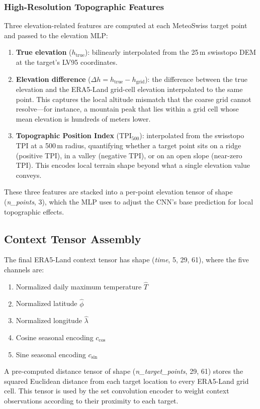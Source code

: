\subsubsection{High-Resolution Topographic Features}

Three elevation-related features are computed at each MeteoSwiss target point and passed to the elevation MLP:

\begin{enumerate}
    \item \textbf{True elevation} ($h_{\text{true}}$): bilinearly interpolated from the 25\,m swisstopo DEM at the target's LV95 coordinates.

    \item \textbf{Elevation difference} ($\Delta h = h_{\text{true}} - h_{\text{grid}}$): the difference between the true elevation and the ERA5-Land grid-cell elevation interpolated to the same point. This captures the local altitude mismatch that the coarse grid cannot resolve---for instance, a mountain peak that lies within a grid cell whose mean elevation is hundreds of meters lower.

    \item \textbf{Topographic Position Index} (TPI$_{500}$): interpolated from the swisstopo TPI at a 500\,m radius, quantifying whether a target point sits on a ridge (positive TPI), in a valley (negative TPI), or on an open slope (near-zero TPI). This encodes local terrain shape beyond what a single elevation value conveys.
\end{enumerate}

These three features are stacked into a per-point elevation tensor of shape (\textit{n\_points}, 3), which the MLP uses to adjust the CNN's base prediction for local topographic effects.

\subsection{Context Tensor Assembly}

The final ERA5-Land context tensor has shape (\textit{time}, 5, 29, 61), where the five channels are:
%
\begin{enumerate}
    \item Normalized daily maximum temperature $\hat{T}$
    \item Normalized latitude $\hat{\phi}$
    \item Normalized longitude $\hat{\lambda}$
    \item Cosine seasonal encoding $c_{\cos}$
    \item Sine seasonal encoding $c_{\sin}$
\end{enumerate}
%
A pre-computed distance tensor of shape (\textit{n\_target\_points}, 29, 61) stores the squared Euclidean distance from each target location to every ERA5-Land grid cell. This tensor is used by the set convolution encoder to weight context observations according to their proximity to each target.

